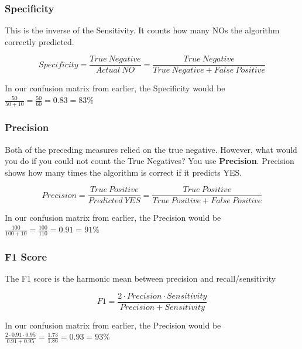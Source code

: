 \documentclass[11pt]{article}
\begin{document}
\subsubsection{Specificity}
This is the inverse of the Sensitivity. It counts how many NOs the algorithm correctly predicted.

\begin{equation}
    Specificity= \frac{True\ Negative}{Actual\ NO} = \frac{True\ Negative}{True\ Negative + False\ Positive}
\end{equation}

\vspace{10px}

In our confusion matrix from earlier, the Specificity would be $\frac{50}{50+ 10} = \frac{50}{60} = 0.83 = 83\%$

\subsubsection{Precision}
Both of the preceding measures relied on the true negative. However, what would you do if you could not count the True Negatives? You use \textbf{Precision}. Precision shows how many times the algorithm is correct if it predicts YES.

\begin{equation}
    Precision = \frac{True\ Positive}{Predicted\ YES} = \frac{True\ Positive}{True\ Positive + False\ Positive}
\end{equation}

\vspace{10px}

In our confusion matrix from earlier, the Precision would be $\frac{100}{100+ 10} = \frac{100}{110} = 0.91 = 91\%$

\subsubsection{F1 Score}

The F1 score is the harmonic mean between precision and recall/sensitivity

\begin{equation}
    F1 = \frac{2 \cdot Precision \cdot Sensitivity}{Precision + Sensitivity}
\end{equation}

In our confusion matrix from earlier, the Precision would be $\frac{2 \cdot 0.91 \cdot 0.95}{0.91 + 0.95} = \frac{1.73}{1.86} = 0.93 = 93\%$

\vspace{10px}
\end{document}

